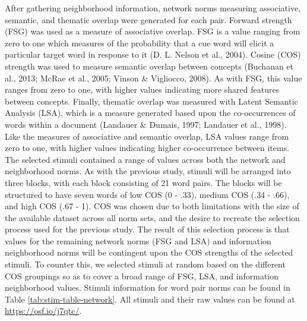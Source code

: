 \documentclass[english,man]{apa6}
\theoremstyle{definition}
\theoremstyle{definition}
\theoremstyle{definition}
\theoremstyle{remark}
\begin{document}
After gathering neighborhood information, network norms measuring
associative, semantic, and thematic overlap were generated for each
pair. Forward strength (FSG) was used as a measure of associative
overlap. FSG is a value ranging from zero to one which measures of the
probability that a cue word will elicit a particular target word in
response to it (D. L. Nelson et al., 2004). Cosine (COS) strength was
used to measure semantic overlap between concepts (Buchanan et al.,
2013; McRae et al., 2005; Vinson \& Vigliocco, 2008). As with FSG, this
value ranges from zero to one, with higher values indicating more shared
features between concepts. Finally, thematic overlap was measured with
Latent Semantic Analysis (LSA), which is a measure generated based upon
the co-occurrences of words within a document (Landauer \& Dumais, 1997;
Landauer et al., 1998). Like the measures of associative and semantic
overlap, LSA values range from zero to one, with higher values
indicating higher co-occurrence between items. The selected stimuli
contained a range of values across both the network and neighborhood
norms. As with the previous study, stimuli will be arranged into three
blocks, with each block consisting of 21 word pairs. The blocks will be
structured to have seven words of low COS (0 - .33), medium COS (.34 -
.66), and high COS (.67 - 1). COS was chosen due to both limitations
with the size of the available dataset across all norm sets, and the
desire to recreate the selection process used for the previous study.
The result of this selection process is that values for the remaining
network norms (FSG and LSA) and information neighborhood norms will be
contingent upon the COS strengths of the selected stimuli. To counter
this, we selected stimuli at random based on the different COS groupings
so as to cover a broad range of FSG, LSA, and information neighborhood
values. Stimuli information for word pair norms can be found in Table
\ref{tab:stim-table-network}. All stimuli and their raw values can be
found at \url{https://osf.io/j7qtc/}.
\end{document}
